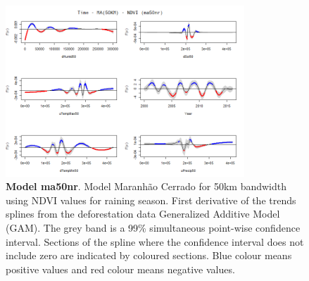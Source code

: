 \begin{table}

\begin{figure}[H]
 \centering
        \centering
        \includegraphics[width=0.8\textwidth]{ma50nr.png} %
        \caption[Model Cerrado Maranhão for 50km bandwidth using NDVI values for raining season. First derivative of the trends splines from the deforestation data Generalized Additive Model (GAM)]{\textbf{Model ma50nr}. Model Maranhão Cerrado for 50km bandwidth using NDVI values for raining season. First derivative of the trends splines from the deforestation data Generalized Additive Model (GAM). The grey band is a 99\% simultaneous point-wise confidence interval. Sections of the spline where the confidence interval does not include zero are indicated by coloured sections. Blue colour means positive values and red colour means negative values.}
\end{figure}
\end{table}

